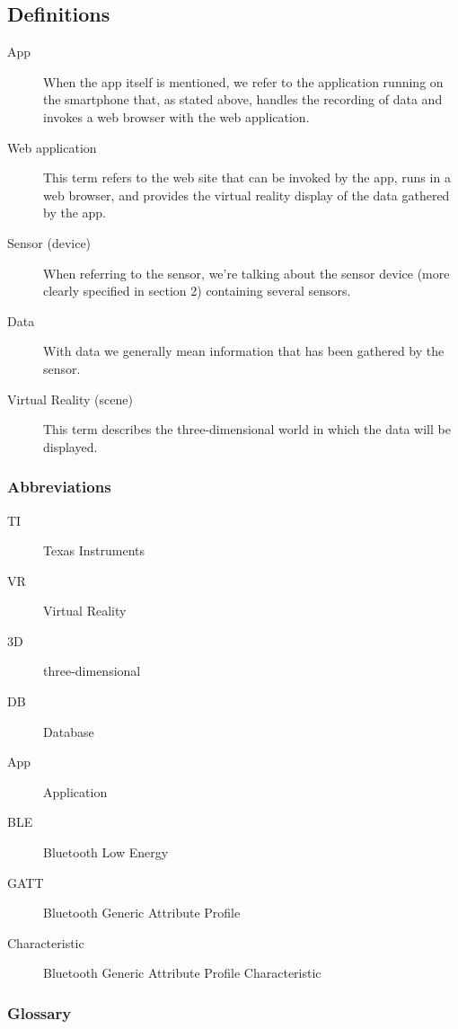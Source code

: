 \subsection{Definitions}

\begin{description}
	\item[App] When the app itself is mentioned, we refer to the application running on the smartphone that, as stated above, handles the recording of data and invokes a web browser with the web application.
	\item[Web application] This term refers to the web site that can be invoked by the app, runs in a web browser, and provides the virtual reality display of the data gathered by the app.
	\item[Sensor (device)] When referring to the sensor, we're talking about the sensor device (more clearly specified in section 2) containing several sensors.
	\item[Data] With data we generally mean information that has been gathered by the sensor.
	\item[Virtual Reality (scene)] This term describes the three-dimensional world in which the data will be displayed.

\end{description}


\subsubsection{Abbreviations}

\begin{description}
	\item[TI] Texas Instruments
	\item[VR] Virtual Reality
	\item[3D] three-dimensional
	\item[DB] Database
	\item[App] Application
	\item[BLE] Bluetooth Low Energy
	\item[GATT] Bluetooth Generic Attribute Profile
	\item[Characteristic] Bluetooth Generic Attribute Profile Characteristic
\end{description}

\subsubsection{Glossary}


